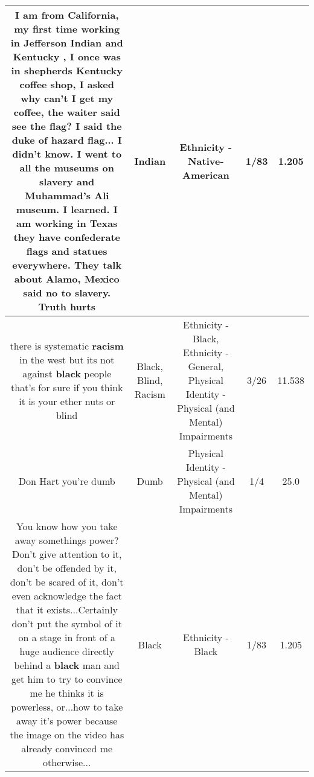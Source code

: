 \documentclass[11pt]{article}
\newlength\mylength
\begin{document}
\begin{center}
\begin{longtable}{|C{.65\mylength}|C{.30\mylength}|C{.12\mylength}|C{.12\mylength}|C{.12\mylength}|}
  \small I am from California, my first time working in Jefferson \textbf{Indian} and Kentucky , I once was in shepherds Kentucky coffee shop, I asked why can't I get my coffee, the waiter said see the flag?   I said the duke of hazard flag...   I didn't know.  I went to all the museums on slavery and Muhammad's Ali museum. I learned.   I am working in Texas they have confederate flags and statues everywhere.   They talk about Alamo, Mexico said no to slavery.   Truth hurts\normalsize   & Indian & Ethnicity - Native-American & 1/83 & 1.205 \\  \hline
  \small there is systematic \textbf{racism} in the west but its not against \textbf{black} people that's for sure if you think it is your ether nuts or blind\normalsize   & Black, Blind, Racism & Ethnicity - Black, Ethnicity - General, Physical Identity - Physical (and Mental) Impairments & 3/26 & 11.538 \\  \hline
  \small Don Hart you're dumb\normalsize   & Dumb & Physical Identity - Physical (and Mental) Impairments & 1/4 & 25.0 \\  \hline
  \small You know how you take away somethings power?Don't give attention to it, don't be offended by it, don't be scared of it, don't even acknowledge the fact that it exists...Certainly don't put the symbol of it on a stage in front of a huge audience directly behind a \textbf{black} man and get him to try to convince me he thinks it is powerless, or...how to take away it's power because the image on the video has already convinced me otherwise...\normalsize   & Black & Ethnicity - Black & 1/83 & 1.205 \\  \hline

\end{longtable}
\end{center}
\end{document}
